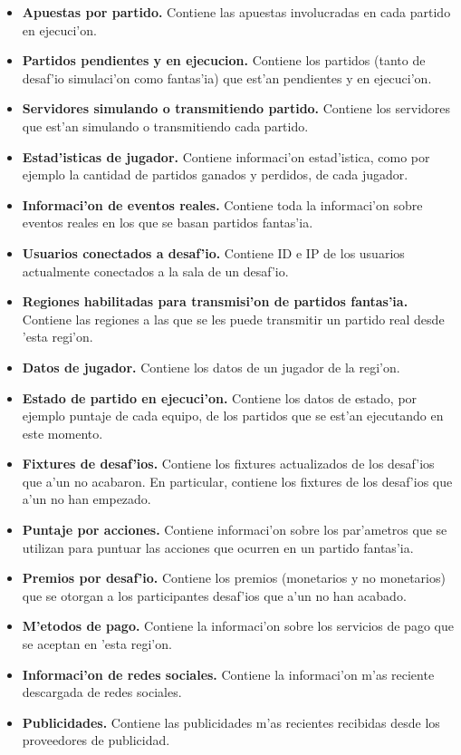 \begin{itemize}
	\item \textbf{Apuestas por partido.} Contiene las apuestas involucradas en cada partido en ejecuci'on.
	\item \textbf{Partidos pendientes y en ejecucion.} Contiene los partidos (tanto de desaf'io simulaci'on como fantas'ia) que est'an pendientes y en ejecuci'on.
	\item \textbf{Servidores simulando o transmitiendo partido.} Contiene los servidores que est'an simulando o transmitiendo cada partido.
	\item \textbf{Estad'isticas de jugador.} Contiene informaci'on estad'istica, como por ejemplo la cantidad de partidos ganados y perdidos, de cada jugador.
	\item \textbf{Informaci'on de eventos reales.} Contiene toda la informaci'on sobre eventos reales en los que se basan partidos fantas'ia.
	\item \textbf{Usuarios conectados a desaf'io.} Contiene ID e IP de los usuarios actualmente conectados a la sala de un desaf'io.
	\item \textbf{Regiones habilitadas para transmisi'on de partidos fantas'ia.} Contiene las regiones a las que se les puede transmitir un partido real desde 'esta regi'on.
	\item \textbf{Datos de jugador.} Contiene los datos de un jugador de la regi'on.
	\item \textbf{Estado de partido en ejecuci'on.} Contiene los datos de estado, por ejemplo puntaje de cada equipo, de los partidos que se est'an ejecutando en este momento.
	\item \textbf{Fixtures de desaf'ios.} Contiene los fixtures actualizados de los desaf'ios que a'un no acabaron. En particular, contiene los fixtures de los desaf'ios que a'un no han empezado.
	\item \textbf{Puntaje por acciones.} Contiene informaci'on sobre los par'ametros que se utilizan para puntuar las acciones que ocurren en un partido fantas'ia.
	\item \textbf{Premios por desaf'io.} Contiene los premios (monetarios y no monetarios) que se otorgan a los participantes desaf'ios que a'un no han acabado.
	\item \textbf{M'etodos de pago.} Contiene la informaci'on sobre los servicios de pago que se aceptan en 'esta regi'on.
	\item \textbf{Informaci'on de redes sociales.} Contiene la informaci'on m'as reciente descargada de redes sociales.
	\item \textbf{Publicidades.} Contiene las publicidades m'as recientes recibidas desde los proveedores de publicidad.
\end{itemize}

